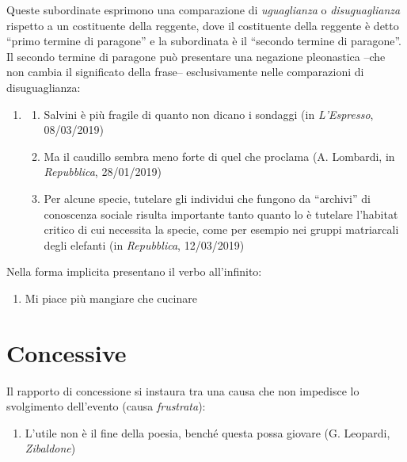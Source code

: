 \documentclass[
  a4paper,
  twoside,
  11pt,
  chapterprefix=false,
  bibliography=totocnumbered,
  listof=flat]{scrbook}
\providecommand{\tightlist}{%
  \setlength{\itemsep}{0pt}\setlength{\parskip}{0pt}}
\begin{document}
Queste subordinate esprimono una comparazione di \emph{uguaglianza} o \emph{disuguaglianza} rispetto a un costituente della reggente, dove il costituente della reggente è detto \enquote{primo termine di paragone} e la subordinata è il \enquote{secondo termine di paragone}. Il secondo termine di paragone può presentare una negazione pleonastica --che non cambia il significato della frase-- esclusivamente nelle comparazioni di disuguaglianza:

\begin{enumerate}
\def\labelenumi{(\arabic{enumi})}
\setcounter{enumi}{77}
\item
  \begin{enumerate}
  \def\labelenumii{\alph{enumii}.}
  \tightlist
  \item
    Salvini è più fragile di quanto non dicano i sondaggi (in \emph{L'Espresso}, 08/03/2019)
  \item
    Ma il caudillo sembra meno forte di quel che proclama (A. Lombardi, in \emph{Repubblica}, 28/01/2019)
  \item
    Per alcune specie, tutelare gli individui che fungono da \enquote{archivi} di conoscenza sociale risulta importante tanto quanto lo è tutelare l'habitat critico di cui necessita la specie, come per esempio nei gruppi matriarcali degli elefanti (in \emph{Repubblica}, 12/03/2019)
  \end{enumerate}
\end{enumerate}

Nella forma implicita presentano il verbo all'infinito:

\begin{enumerate}
\def\labelenumi{(\arabic{enumi})}
\setcounter{enumi}{78}
\tightlist
\item
  Mi piace più mangiare che cucinare
\end{enumerate}

\hypertarget{concessive}{%
\section{Concessive}\label{concessive}}

Il rapporto di concessione si instaura tra una causa che non impedisce lo svolgimento dell'evento (causa \emph{frustrata}):

\begin{enumerate}
\def\labelenumi{(\arabic{enumi})}
\setcounter{enumi}{79}
\tightlist
\item
  L'utile non è il fine della poesia, benché questa possa giovare (G. Leopardi, \emph{Zibaldone})
\end{enumerate}
\end{document}
